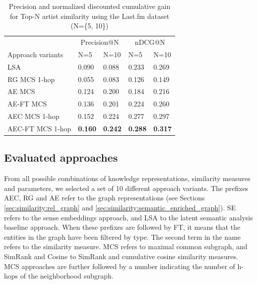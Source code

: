 \begin{table}
\small
\centering
	\begin{tabular}{ lllll }
 	\toprule
	& \multicolumn{2}{c}{Precision@N} & \multicolumn{2}{c}{nDCG@N} \\
\cmidrule(lr){2-3}
 \cmidrule(lr){4-5}
	Approach variants & N=5 & N=10 & N=5 & N=10 \\
	\midrule
LSA & 0.090 & 0.088 & 0.233 & 0.269 \\
RG MCS 1-hop & 0.055 & 0.083 & 0.126 & 0.149 \\
AE MCS & 0.124 & 0.200 & 0.184 & 0.216 \\
AE-FT MCS & 0.136 & 0.201 & 0.224 & 0.260 \\
AEC MCS 1-hop & 0.152 & 0.224 & 0.277 & 0.297 \\
AEC-FT MCS 1-hop & \textbf{0.160} & \textbf{0.242} & \textbf{0.288} & \textbf{0.317} \\
\bottomrule
	\end{tabular}
	\caption{Precision and normalized discounted cumulative gain for Top-N artist similarity using the Last.fm dataset (N=\{5, 10\})}	
	\label{tbl:similarity:res_lastfm}
\end{table}
\subsection{Evaluated approaches}\label{sec:similarity:eval_approaches} %

From all possible combinations of knowledge representations, similarity measures and parameters, we selected a set of 10 different approach variants. The prefixes AEC, RG and AE refer to the graph representations (see Sections \ref{sec:similarity:rel_graph} and \ref{sec:similarity:semantic_enriched_graph}). %
SE refers to the sense embeddings approach, and LSA to the latent semantic analysis baseline approach. When these prefixes are followed by FT, it means that the entities in the graph have been filtered by type. The second term in the name refers to the similarity measure. MCS refers to maximal common subgraph, and SimRank and Cosine to SimRank and cumulative cosine similarity measures. MCS approaches are further followed by a number indicating the number of h-hops of the neighborhood subgraph.


